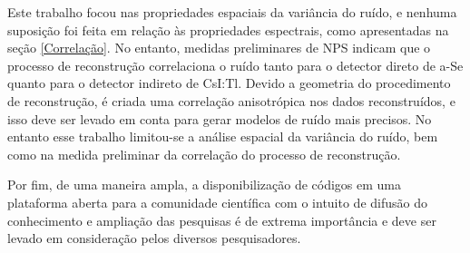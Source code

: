 Este trabalho focou nas propriedades espaciais da variância do ruído, e nenhuma suposição foi feita em relação às propriedades espectrais, como apresentadas na seção \ref{Correlação}. No entanto, medidas preliminares de \acs{NPS} indicam que o processo de reconstrução correlaciona o ruído tanto para o detector direto de \acs{a-Se} quanto para o detector indireto de \acs{CsI:Tl}. Devido a geometria do procedimento de reconstrução, é criada uma correlação anisotrópica nos dados reconstruídos, e isso deve ser levado em conta para gerar modelos de ruído mais precisos. No entanto esse trabalho limitou-se a análise espacial da variância do ruído, bem como na medida preliminar da correlação do processo de reconstrução.

Por fim, de uma maneira ampla, a disponibilização de códigos em uma plataforma aberta para a comunidade científica com o intuito de difusão do conhecimento e ampliação das pesquisas é de extrema importância e deve ser levado em consideração pelos diversos pesquisadores. 









